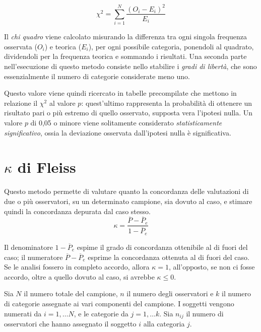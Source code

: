 \begin{equation}
\label{eq:chi_square}
\chi^2 = \sum_{i=1}^N \frac{{(O_i-E_i)}^2}{E_i}
\end{equation}

Il \emph{chi quadro} viene calcolato misurando la differenza tra ogni singola frequenza osservata ($O_i$) e teorica ($E_i$), per ogni possibile categoria, ponendoli al quadrato, dividendoli per la frequenza teorica e sommando i risultati. Una seconda parte nell'esecuzione di questo metodo consiste nello stabilire i \emph{gradi di libertà}, che sono essenzialmente il numero di categorie considerate meno uno.

Questo valore viene quindi ricercato in tabelle precompilate che mettono in relazione il $\chi^2$ al valore $p$: quest'ultimo rappresenta la probabilità di ottenere un risultato pari o più estremo di quello osservato, supposta vera l'ipotesi nulla. Un valore $p$ di 0,05 o minore viene solitamente considerato \emph{statisticamente significativo}, ossia la deviazione osservata dall'ipotesi nulla è significativa.

\section{$\kappa$ di Fleiss}
Questo metodo permette di valutare quanto la concordanza delle valutazioni di due o più osservatori, su un determinato campione, sia dovuto al caso, e stimare quindi la concordanza depurata dal caso stesso.
\begin{equation}
\label{eq:kappa_fleiss}
\kappa = \frac{\overline{P} - \overline{P}_e}{1 - \overline{P}_e}
\end{equation}

Il denominatore $1 - \overline{P}_e$ espime il grado di concordanza ottenibile al di fuori del caso; il numeratore $\overline{P} - \overline{P}_e$ esprime la concordanza ottenuta al di fuori del caso. Se le analisi fossero in completo accordo, allora $\kappa = 1$, all'opposto, se non ci fosse accordo, oltre a quello dovuto al caso, si avrebbe $\kappa \leq 0$.

Sia $N$ il numero totale del campione, $n$ il numero degli osservatori e $k$ il numero di categorie assegnate ai vari componenti del campione. I soggetti vengono numerati da $i = 1, \ldots N$, e le categorie da $j = 1, \ldots k$. Sia $n_{ij}$ il numero di osservatori che hanno assegnato il soggetto $i$ alla categoria $j$.


